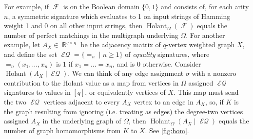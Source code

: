 \documentclass{article}
\theoremstyle{remark}
\theoremstyle{definition}
\DeclareMathOperator{\rr}{\mathbb{R}}
\DeclareMathOperator{\fc}{\mathcal{F}}
\DeclareMathOperator{\holant}{Holant}
\DeclareMathOperator{\eq}{\mathcal{EQ}}
\begin{document}
For example, if $\fc$ is on the Boolean domain $\{0,1\}$ and consists of, for each arity $n$, a symmetric
signature which evaluates to 1 on input strings of Hamming weight 1 and 0 on all other input strings,
then $\holant_{\Omega}(\fc)$ equals the number of perfect matchings in the multigraph underlying
$\Omega$. For another example, let $A_X \in \rr^{q \times q}$ be the 
adjacency matrix of $q$-vertex weighted graph $X$, and define the set
$\eq = \{=_n \mid n \geq 1\}$ of \emph{equality}
signatures, where $=_n(x_1,\ldots,x_n)$ is 1 if $x_1 = \ldots = x_n$, and is 0 otherwise. 
Consider $\holant(A_X \mid \eq)$. We can think of any edge assignment
$\sigma$ with a nonzero contribution to the Holant value as a map from vertices in $\Omega$ assigned
$\eq$ signatures to values in $[q]$, or equivalently vertices of $X$. This map must send the two 
$\eq$ vertices
adjacent to every $A_X$ vertex to an edge in $A_X$, so, if $K$ is the graph resulting from ignoring
(i.e. treating as edges) the degree-two vertices assigned $A_X$ in the underlying graph of $\Omega$,
then $\holant_{\Omega}(A_X \mid \eq)$ equals the number of graph homomorphisms from $K$ to $X$.
See \autoref{fig:hom}.
\end{document}
